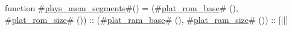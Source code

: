 function #\hyperref[sailRISCVzphyszymemzysegments]{phys\_mem\_segments}#() =
  (#\hyperref[sailRISCVzplatzyromzybase]{plat\_rom\_base}# (), #\hyperref[sailRISCVzplatzyromzysizze]{plat\_rom\_size}# ()) ::
  (#\hyperref[sailRISCVzplatzyramzybase]{plat\_ram\_base}# (), #\hyperref[sailRISCVzplatzyramzysizze]{plat\_ram\_size}# ()) ::
  [||]
